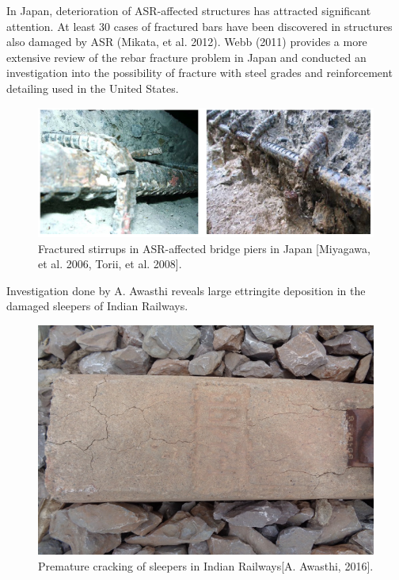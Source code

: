 
In Japan, deterioration of ASR-affected structures  has attracted significant attention. At least 30 cases of fractured bars have been discovered in structures also damaged by ASR (Mikata, et al. 2012)\cite{Mikata}. Webb (2011) \cite{Webb} provides a more extensive review of the rebar fracture problem in Japan and conducted an investigation into the possibility of fracture with steel grades and reinforcement detailing used in the United States.

    \begin{figure}[ht!]
        \centering
        \includegraphics[width=.9\linewidth]{Files/Background/Miyagawa.png}
        \caption{Fractured stirrups in ASR-affected bridge piers in Japan [Miyagawa, et al. 2006, Torii, et al. 2008].}
        \label{fig:Miyagawa}
    \end{figure}



Investigation done by A. Awasthi\cite{Awasthi} reveals large ettringite deposition in the damaged sleepers of Indian Railways.

    \begin{figure}[ht!]
        \centering
        \includegraphics[width=.6\linewidth]{Files/Background/Anupam_1.png}
        \caption{Premature cracking of sleepers in Indian Railways[A. Awasthi, 2016].}
        \label{fig:Awasthi_1}
    \end{figure}

